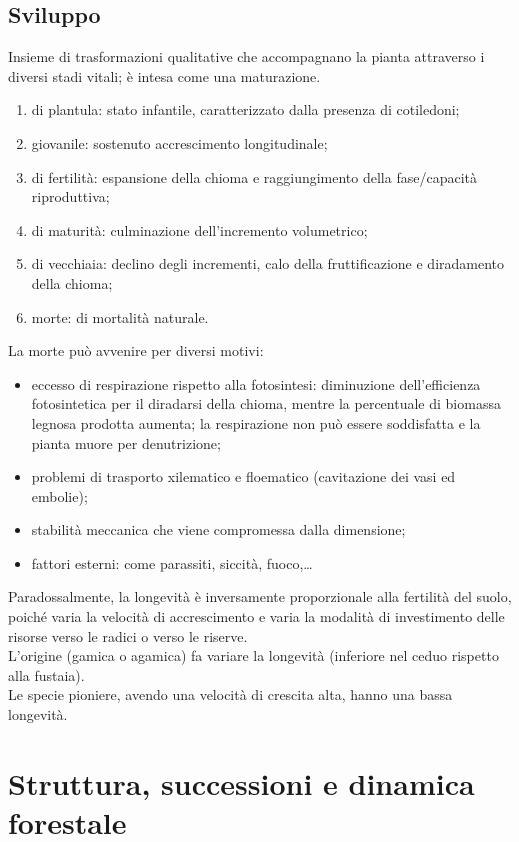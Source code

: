 \documentclass{article}
\begin{document}
\subsection{Sviluppo}
Insieme di trasformazioni qualitative che accompagnano la pianta attraverso i diversi stadi vitali; è intesa come una maturazione.\\
\begin{enumerate}
    \item di plantula: stato infantile, caratterizzato dalla presenza di cotiledoni;
    \item giovanile: sostenuto accrescimento longitudinale;
    \item di fertilità: espansione della chioma e raggiungimento della fase/capacità riproduttiva;
    \item di maturità: culminazione dell'incremento volumetrico;
    \item di vecchiaia: declino degli incrementi, calo della fruttificazione e diradamento della chioma;
    \item morte: di mortalità naturale.
\end{enumerate}
La morte può avvenire per diversi motivi:
\begin{itemize}
    \item eccesso di respirazione rispetto alla fotosintesi: diminuzione dell'efficienza fotosintetica per il diradarsi della chioma, mentre la percentuale di biomassa legnosa prodotta aumenta; la respirazione non può essere soddisfatta e la pianta muore per denutrizione;
    \item problemi di trasporto xilematico e floematico (cavitazione dei vasi ed embolie);
    \item stabilità meccanica che viene compromessa dalla dimensione;
    \item fattori esterni: come parassiti, siccità, fuoco,\dots
\end{itemize}
Paradossalmente, la longevità è inversamente proporzionale alla fertilità del suolo, poiché varia la velocità di accrescimento e varia la modalità di investimento delle risorse verso le radici o verso le riserve.\\
L'origine (gamica o agamica) fa variare la longevità (inferiore nel ceduo rispetto alla fustaia).\\
Le specie pioniere, avendo una velocità di crescita alta, hanno una bassa longevità.

\section{Struttura, successioni e dinamica forestale}
\end{document}
